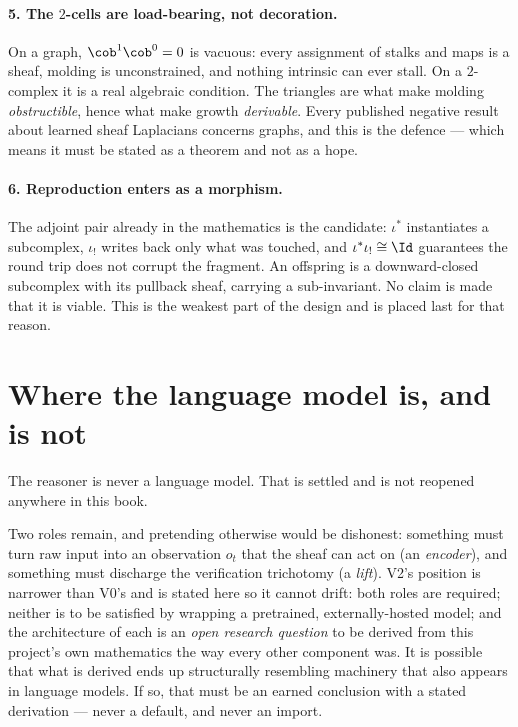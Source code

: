 \paragraph{5. The $2$-cells are load-bearing, not decoration.} On a graph,
$\cob^1\cob^0=0$ is vacuous: every assignment of stalks and maps is a sheaf,
molding is unconstrained, and nothing intrinsic can ever stall. On a
$2$-complex it is a real algebraic condition. The triangles are what make
molding \emph{obstructible}, hence what make growth \emph{derivable}. Every
published negative result about learned sheaf Laplacians concerns graphs, and
this is the defence --- which means it must be stated as a theorem and not as
a hope.

\paragraph{6. Reproduction enters as a morphism.} The adjoint pair already in
the mathematics is the candidate: $\iota^*$ instantiates a subcomplex,
$\iota_!$ writes back only what was touched, and $\iota^*\iota_! \cong \Id$
guarantees the round trip does not corrupt the fragment. An offspring is a
downward-closed subcomplex with its pullback sheaf, carrying a sub-invariant.
No claim is made that it is viable. This is the weakest part of the design and
is placed last for that reason.

\section{Where the language model is, and is not}\label{sec:encoder-position}

\begin{hon}
\Hon The reasoner is never a language model. That is settled and is not
reopened anywhere in this book.

Two roles remain, and pretending otherwise would be dishonest: something must
turn raw input into an observation $o_t$ that the sheaf can act on (an
\emph{encoder}), and something must discharge the verification trichotomy
(a \emph{lift}). V2's position is narrower than V0's and is stated here so it
cannot drift: both roles are required; neither is to be satisfied by wrapping
a pretrained, externally-hosted model; and the architecture of each is an
\emph{open research question} to be derived from this project's own
mathematics the way every other component was. It is possible that what is
derived ends up structurally resembling machinery that also appears in
language models. If so, that must be an earned conclusion with a stated
derivation --- never a default, and never an import.
\end{hon}

